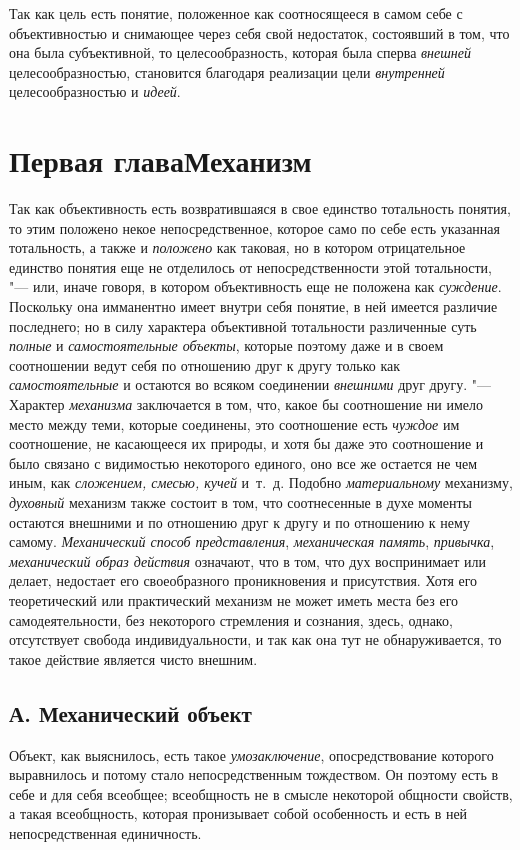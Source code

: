 {{Так как цель есть понятие, положенное как соотносящееся в
самом себе с объективностью и снимающее через себя свой недостаток,
состоявший в том, что она была субъективной, то целесообразность, которая
была сперва {\em внешней} целесообразностью, становится благодаря реализации
цели {\em внутренней} целесообразностью и {\em идеей}.

\chapter[Первая глава Механизм]{Первая глава\newline Механизм}
Так как объективность есть возвратившаяся в свое единство
тотальность понятия, то этим положено некое непосредственное, которое само
по себе есть указанная тотальность, а также и {\em положено} как
таковая, но в котором отрицательное единство понятия еще не отделилось от
непосредственности этой тотальности, "--- или, иначе говоря, в
котором объективность еще не положена как {\em суждение}. Поскольку
она имманентно имеет внутри себя понятие, в ней имеется различие
последнего; но в силу характера объективной тотальности различенные суть
{\em полные} и {\em самостоятельные объекты},
которые поэтому даже и в своем соотношении ведут себя по
отношению друг к другу только как {\em самостоятельные} и
остаются во всяком соединении {\em внешними} друг другу. "--- Характер
{\em механизма} заключается в том, что, какое бы соотношение ни имело место
между теми, которые соединены, это соотношение есть {\em чуждое} им
соотношение, не касающееся их природы, и хотя бы даже это соотношение и
было связано с видимостью некоторого единого, оно все же остается не чем
иным, как {\em сложением, смесью, кучей} и~т.~д. Подобно {\em материальному}
механизму, {\em духовный}
механизм также состоит в том, что соотнесенные в духе моменты
остаются внешними и по отношению друг к другу и по отношению к нему самому.
{\em Механический способ представления}, {\em механическая
память}, {\em привычка}, {\em механический образ действия} означают, что в
том, что дух воспринимает или делает, недостает его
своеобразного проникновения и присутствия. Хотя его
теоретический или практический механизм не может иметь места без его
самодеятельности, без некоторого стремления и сознания, здесь, однако,
отсутствует свобода индивидуальности, и так как она тут не обнаруживается,
то такое действие является чисто внешним.

\section[А. Механический объект]{А. Механический объект}
Объект, как выяснилось, есть такое {\em умозаключение},
опосредствование которого выравнилось и потому стало непосредственным
тождеством. Он поэтому есть в себе и для себя всеобщее; всеобщность не в
смысле некоторой общности свойств, а такая всеобщность, которая пронизывает
собой особенность и есть в ней непосредственная единичность.

}}
